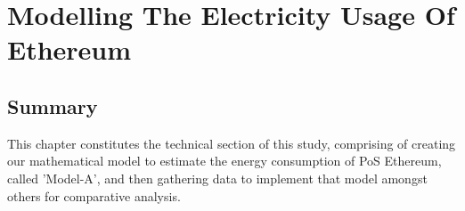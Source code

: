 \chapter{Modelling The Electricity Usage Of Ethereum}
\label{Modelling}

\section{Summary}

This chapter constitutes the technical section of this study, comprising of creating our mathematical model to estimate the energy consumption of PoS Ethereum, called 'Model-A', and then gathering data to implement that model amongst others for comparative analysis. 




    
    
    
    
